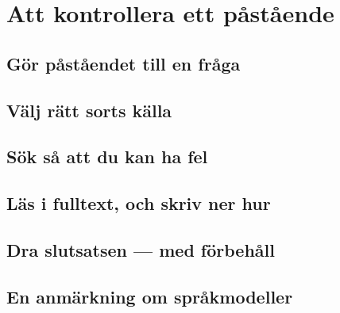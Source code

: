 
\chapter{Att kontrollera ett påstående}
\label{app:verifiera}

\section{Gör påståendet till en fråga}
\section{Välj rätt sorts källa}
\section{Sök så att du kan ha fel}
\section{Läs i fulltext, och skriv ner hur}
\section{Dra slutsatsen --- med förbehåll}
\section{En anmärkning om språkmodeller}

